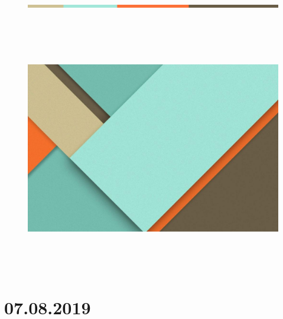 \documentclass[12pt]{article}
\begin{document}

\begin{figure}[H]
	\begin{Center}
		\includegraphics[width=6.47in,height=0.11in]{./media/image13.png}
	\end{Center}
\end{figure}



\subsection*{ }



\begin{figure}[H]
	\begin{Center}
		\includegraphics[width=6.46in,height=4.31in]{./media/image18.jpg}
	\end{Center}
\end{figure}



\par

\chapter{07.08.2019}\par
\end{document}
